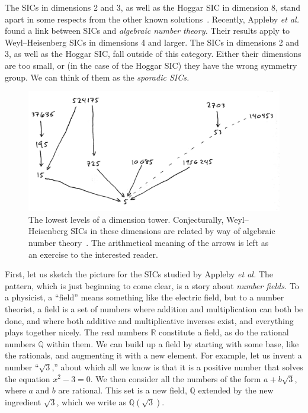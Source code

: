 \documentclass[aps,pra,superscriptaddress,12pt,tightenlines,nofootinbib]{revtex4-2}
\begin{document}
The SICs in dimensions 2 and 3, as well as the Hoggar SIC in dimension
8, stand apart in some respects from the other known
solutions~\cite{RCF-SIC, stacey-qutrit}.  Recently, Appleby \emph{et
  al.}~\cite{RCF-SIC} found a link between SICs and \emph{algebraic
  number theory.}  Their results apply to Weyl--Heisenberg SICs in
dimensions 4 and larger.  The SICs in dimensions 2 and 3, as well as
the Hoggar SIC, fall outside of this category.  Either their
dimensions are too small, or (in the case of the Hoggar SIC) they have
the wrong symmetry group.  We can think of them as the \emph{sporadic
  SICs.}


\begin{figure}
\begin{center}
\includegraphics[width=12cm]{dimension-tower}
\end{center}
\caption{\label{fig:dimension-tower} The lowest levels of a dimension
  tower.  Conjecturally, Weyl--Heisenberg SICs in these dimensions are
  related by way of algebraic number theory~\cite{RCF-SIC}.  The
  arithmetical meaning of the arrows is left as an exercise to the
  interested reader.}
\end{figure}


First, let us sketch the picture for the SICs studied by Appleby
\emph{et al.}  The pattern, which is just beginning to come clear, is
a story about {\it number fields.}  To a physicist, a ``field'' means
something like the electric field, but to a number theorist, a field
is a set of numbers where addition and multiplication can both be
done, and where both additive and multiplicative inverses exist, and
everything plays together nicely.  The real numbers $\mathbb{R}$
constitute a field, as do the rational numbers $\mathbb{Q}$ within
them.  We can build up a field by starting with some base, like the
rationals, and augmenting it with a new element.  For example, let us
invent a number ``$\sqrt{3}$,'' about which all we know is that it is
a positive number that solves the equation $x^2 - 3 = 0$.  We then
consider all the numbers of the form $a + b\sqrt{3}$, where $a$ and
$b$ are rational.  This set is a new field, $\mathbb{Q}$ extended by
the new ingredient $\sqrt{3}$, which we write as
$\mathbb{Q}(\sqrt{3})$.
\end{document}
